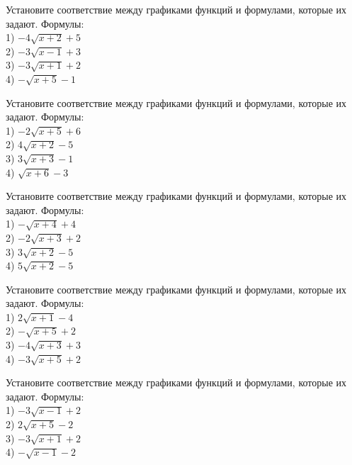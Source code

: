 \documentclass[4apaper]{article}
\begin{document}
\begin{taskBN}{41}
Установите соответствие между графиками функций и формулами, которые их задают. Формулы: \\1) $-4\sqrt{x+2}+5$\\2) $-3\sqrt{x-1}+3$\\3) $-3\sqrt{x+1}+2$\\4) $-\sqrt{x+5}-1$
\end{taskBN}

\begin{taskBN}{42}
Установите соответствие между графиками функций и формулами, которые их задают. Формулы: \\1) $-2\sqrt{x+5}+6$\\2) $4\sqrt{x+2}-5$\\3) $3\sqrt{x+3}-1$\\4) $\sqrt{x+6}-3$
\end{taskBN}

\begin{taskBN}{43}
Установите соответствие между графиками функций и формулами, которые их задают. Формулы: \\1) $-\sqrt{x+4}+4$\\2) $-2\sqrt{x+3}+2$\\3) $3\sqrt{x+2}-5$\\4) $5\sqrt{x+2}-5$
\end{taskBN}

\begin{taskBN}{44}
Установите соответствие между графиками функций и формулами, которые их задают. Формулы: \\1) $2\sqrt{x+1}-4$\\2) $-\sqrt{x+5}+2$\\3) $-4\sqrt{x+3}+3$\\4) $-3\sqrt{x+5}+2$
\end{taskBN}

\begin{taskBN}{45}
Установите соответствие между графиками функций и формулами, которые их задают. Формулы: \\1) $-3\sqrt{x-1}+2$\\2) $2\sqrt{x+5}-2$\\3) $-3\sqrt{x+1}+2$\\4) $-\sqrt{x-1}-2$
\end{taskBN}
\end{document}
